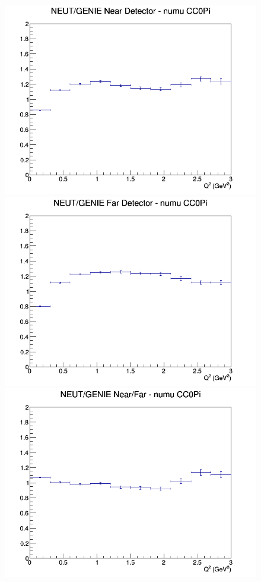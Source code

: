 \documentclass[12pt]{article}
\begin{document}
\begin{figure}[h]
\endminipage
\newline
{}
\includegraphics[width=\linewidth]{eff_Q2/FGT/ratios/CC0Pi_NEUT_GENIE_numu_near_Q2.png}
\endminipage
{}
\includegraphics[width=\linewidth]{eff_Q2/FGT/ratios/CC0Pi_NEUT_GENIE_numu_far_Q2.png}
\endminipage
{}
\includegraphics[width=\linewidth]{eff_Q2/FGT/ratios/CC0Pi_NEUT_GENIE_numu_NF_Q2.png}

\end{figure}
\end{document}
